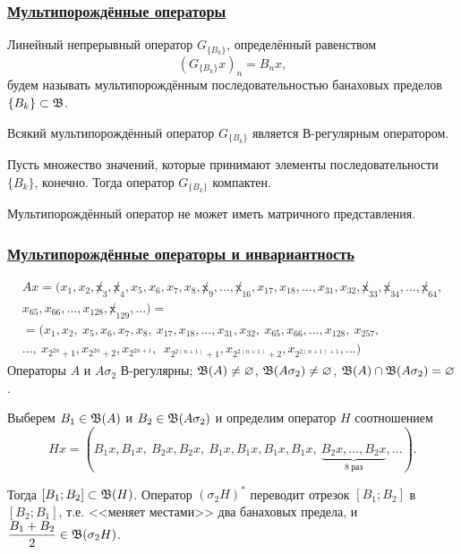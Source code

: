 \begin{frame}\frametitle{\underline{Мультипорождённые операторы}}
	\begin{ddefinition}
		Линейный непрерывный оператор $G_{\{B_k\}}$, определённый равенством
		\begin{equation}
			(G_{\{B_k\}}x)_n = B_n x
			,
		\end{equation}
		будем называть мультипорождённым последовательностью банаховых пределов $\{B_k\}\subset \mathfrak{B}$.
	\end{ddefinition}
	\vfill

	\begin{llemma}
		Всякий мультипорождённый оператор $G_{\{B_k\}}$ является В-регулярным оператором.
	\end{llemma}
	\vfill

	\begin{llemma}
		Пусть множество значений, которые принимают элементы последовательности ${\{B_k\}}$, конечно.
		Тогда оператор $G_{\{B_k\}}$ компактен.
	\end{llemma}
	\vfill

	\begin{ttheorem}
		Мультипорождённый оператор не может иметь матричного представления.
	\end{ttheorem}

\end{frame}


\begin{frame}\frametitle{\underline{Мультипорождённые операторы и инвариантность}}
	\begin{multline}
		Ax = (x_1, x_2, \not x_3, \not x_4, x_5, x_6, x_7, x_8, \not x_9, ..., \not x_{16}, x_{17}, x_{18}, ..., x_{31}, x_{32}, \not x_{33}, \not x_{34}, ..., \not x_{64},
		\\
		x_{65}, x_{66}, ..., x_{128}, \not x_{129}, ...)=
		\\=
		(x_1, x_2, \ x_5, x_6, x_7, x_8, \ x_{17}, x_{18}, ..., x_{31}, x_{32}, \ x_{65}, x_{66}, ..., x_{128}, \ x_{257},
		\\
		..., \ x_{2^{2n} +1}, x_{2^{2n} +2},  x_{2^{2n+1}}, \ \ x_{2^{2(n+1)} +1},  x_{2^{2(n+1)} +2},  x_{2^{2(n+1)+1}}, ...)
	\end{multline}
	Операторы $A$ и $A\sigma_2$ В-регулярны; $\mathfrak{B}(A) \ne\varnothing$, $\mathfrak{B}(A\sigma_2) \ne\varnothing$,
	$\mathfrak{B}(A) \cap \mathfrak{B}(A\sigma_2) =\varnothing$.

	\vfill

	Выберем $B_1 \in \mathfrak{B} (A)$ и $B_2 \in \mathfrak{B}(A\sigma_2)$ и определим оператор $H$ соотношением
	\begin{equation}
		Hx = (B_1 x, B_1 x, \ B_2 x, B_2 x, \ B_1 x, B_1 x, B_1 x, B_1 x, \ \underbrace{B_2 x, ..., B_2 x}_{8~\mbox{раз}}, ...)
		.
	\end{equation}

	Тогда $[B_1; B_2]\subset \mathfrak{B}(H)$.
	Оператор $(\sigma_2 H)^*$ переводит отрезок $[B_1; B_2]$ в $[B_2; B_1]$,
	т.е. <<меняет местами>> два банаховых предела,
	и $\dfrac{B_1 + B_2}2 \in \mathfrak{B}(\sigma_2 H)$.
\end{frame}

